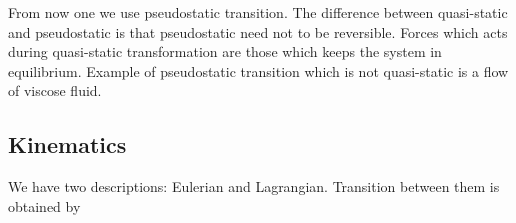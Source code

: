 \documentclass[../main.tex]{subfiles}
\begin{document}
    From now one we use pseudostatic transition.
    The difference between quasi-static and pseudostatic is that pseudostatic need not to be reversible.
    Forces which acts during quasi-static transformation are those which keeps the system in equilibrium.
    Example of pseudostatic transition which is not quasi-static is a flow of viscose fluid.

    \begin{figure}
      \centering
      \label{fig:1.6}
    \end{figure}
    
    
    \subsection{Kinematics}

    We have two descriptions: Eulerian and Lagrangian.
    Transition between them is obtained by

    \begin{figure}
      \centering
      \label{fig:1.7}
    \end{figure}
\end{document}
